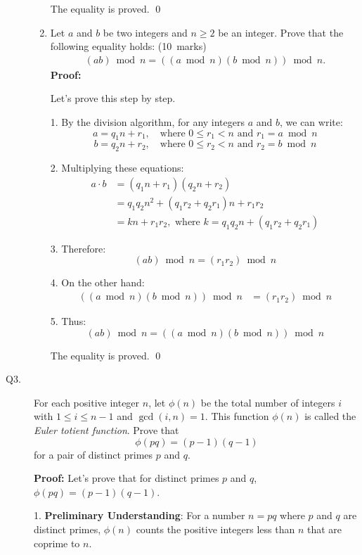 \documentclass[11pt,epsfig]{article}
\begin{document}
\begin{description}
\begin{enumerate}
The equality is proved. \qed


      
\item Let $a$ and $b$ be two integers and $n \geq 2$ be an integer.  Prove that the following equality holds: \hfill (10~marks)  
\begin{eqnarray*}
( a b) \bmod{n}= ((a \bmod{n}) (b \bmod{n})) \bmod{n}.   
\end{eqnarray*}
\textbf{Proof:}

Let's prove this step by step.

1. By the division algorithm, for any integers \(a\) and \(b\), we can write:
    \[
    a = q_1n + r_1, \quad \text{where } 0 \leq r_1 < n \text{ and } r_1 = a \bmod{n}
    \]
    \[
    b = q_2n + r_2, \quad \text{where } 0 \leq r_2 < n \text{ and } r_2 = b \bmod{n}
    \]

2. Multiplying these equations:
    \begin{align*}
    a \cdot b &= (q_1n + r_1)(q_2n + r_2) \\
              &= q_1q_2n^2 + (q_1r_2 + q_2r_1)n + r_1r_2 \\
              &= kn + r_1r_2, \text{ where } k = q_1q_2n + (q_1r_2 + q_2r_1)
    \end{align*}

3. Therefore:
    \[
    (ab) \bmod{n} = (r_1r_2) \bmod{n}
    \]

4. On the other hand:
    \begin{align*}
    ((a \bmod{n})(b \bmod{n})) \bmod{n} &= (r_1r_2) \bmod{n}
    \end{align*}

5. Thus:
    \[
    (ab) \bmod{n} = ((a \bmod{n})(b \bmod{n})) \bmod{n}
    \]

The equality is proved. \qed
              
\end{enumerate} 


\item[Q3.] 
For each positive integer $n$, let $\phi(n)$ be the total number of integers $i$ with $1 \leq i \leq n-1$ and $\gcd(i, n)=1$. 
This function $\phi(n)$ is called the \emph{Euler totient function}. Prove that 
$$
\phi(pq)=(p-1)(q-1) 
$$ 
for a pair of distinct primes $p$ and $q$. \hfill {} 

\noindent \textbf{Proof:} Let's prove that for distinct primes $p$ and $q$, $\phi(pq) = (p-1)(q-1)$.

1. \textbf{Preliminary Understanding}:
    For a number $n = pq$ where $p$ and $q$ are distinct primes, $\phi(n)$ counts the positive integers less than $n$ that are coprime to $n$.


\end{description}
\end{document}
